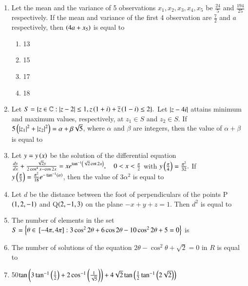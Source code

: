 \documentclass[journal,9pt,onecolumn]{IEEEtran}
\begin{document}
\begin{enumerate}
\item Let the mean and the variance of 5 observations $x_1,x_2,x_3,x_4,x_5$ be $\frac{24}{5}$ and $\frac{194}{25}$ respectively. If the mean and variance of the first 4 observation are $\frac{7}{2}$ and $a$ respectively, then $\left(4a + x_5\right)$ is equal to
\begin{multicols}{4}
\begin{enumerate}
    \item 13
    \item 15
    \item 17
    \item 18
\end{enumerate}
\end{multicols}

\item Let $S = \{z \in \mathbb{C}: \left\vert z-2\right\vert \leq 1, z\left(1+i\right)+\overline{z}\left(1-i\right) \leq 2\}.$ Let $\left\vert z-4i\right\vert$ attains minimum and maximum values, respectively, at $z_1 \in S$ and $z_2 \in S.$ If $5\left(\left\vert z_1\right\vert^2+\left\vert z_2\right\vert^2\right) = \alpha + \beta\sqrt{5}$, where $\alpha$ and $\beta$ are integers, then the value of $\alpha + \beta$ is equal to 

\item Let $y = y\left(x\right)$ be the solution of the differential equation \\$\frac{dy}{dx} + \frac{\sqrt{2}y}{2\cos^4 x - \cos 2x} = xe^{\tan^{-1}\left(\sqrt{2}\cot 2x\right)}, \quad 0 < x < \frac{\pi}{2}$ with $y\left(\frac{\pi}{4}\right) = \frac{\pi^2}{32}.$ If $y\left(\frac{\pi}{3}\right) = \frac{\pi^2}{18}e^{-\tan^{-1}\left(\alpha\right)}$, then the value of $3\alpha^2$ is equal to


\item Let $d$ be the distance between the foot of perpendiculars of the points P$\left(1, 2, -1\right)$ and Q$\left(2, -1, 3\right)$ on the plane $-x+y+z=1.$ Then $d^2$ is equal to 

\item The number of elements in the set $S = \left\{\theta \in {}\left[-4\pi, 4\pi\right] : 3\cos^2 2\theta + 6\cos 2\theta - 10\cos^2 2\theta + 5 = 0 \right\}$ is 

\item The number of solutions of the equation $2\theta - \cos^2\theta + \sqrt{2} = 0$ in $R$ is equal to


\item 50$ \tan\left(3 \tan^{-1}\left(\frac{1}{2}\right) + 2 \cos^{-1}\left(\frac{1}{\sqrt{5}}\right)\right) + 4\sqrt{2} \tan\left(\frac{1}{2} \tan^{-1}\left(2\sqrt{2}\right)\right)$


\end{enumerate}
\end{document}
